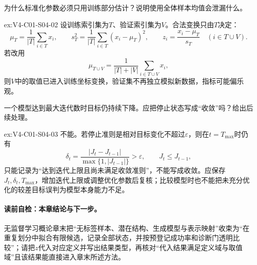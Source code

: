 \begin{SLChapterExercisePairSection}
\begin{exercise}\label{ex:V4-C01-S04-02}
为什么标准化参数必须只用训练部分估计？说明使用全体样本均值会泄漏什么。
\end{exercise}
\ifSLFullEdition
{}\label{sol:V4-C01-S04-02}
\begin{chapterexercisesolution}{ex:V4-C01-S04-02}
设训练索引集为$T$、验证索引集为$V$。合法变换只由$T$决定：
\[
\mu_T=\frac1{|T|}\sum_{i\in T}x_i,
\qquad
s_T^2=\frac1{|T|}\sum_{i\in T}(x_i-\mu_T)^2,
\qquad
z_i=\frac{x_i-\mu_T}{s_T}\quad(i\in T\cup V).
\]
若改用
\[
\mu_{T\cup V}=\frac1{|T|+|V|}\sum_{i\in T\cup V}x_i,
\]
则$V$中的取值已进入训练坐标变换，验证集不再独立模拟新数据，指标可能偏乐观。
\end{chapterexercisesolution}
\fi

\begin{exercise}\label{ex:V4-C01-S04-03}
一个模型达到最大迭代数时目标仍持续下降。应把停止状态写成“收敛”吗？给出后续处理。
\end{exercise}
\ifSLFullEdition
{}\label{sol:V4-C01-S04-03}
\begin{chapterexercisesolution}{ex:V4-C01-S04-03}
不能。若停止准则是相对目标变化不超过$\varepsilon$，则在$t=T_{\max}$时仍有
\[
\delta_t=\frac{|J_t-J_{t-1}|}{\max\{1,|J_{t-1}|\}}>\varepsilon,
\qquad
J_t\le J_{t-1},
\]
只能记录为“达到迭代上限且尚未满足收敛准则”，不能写成收敛。应保存$J_t,\delta_t,T_{\max}$，增加迭代上限或调整优化参数后复核；比较模型时也不能把未充分优化的较差目标误判为模型本身能力不足。
\end{chapterexercisesolution}
\fi

\end{SLChapterExercisePairSection}

\paragraph{读前自检：本章结论与下一步。}无监督学习概论章末把“无标签样本、潜在结构、生成模型与表示映射”收束为“在重复划分中拟合有限候选，记录全部状态，并按预登记成功率和诊断门透明比较”；请把$z$代入对应定义并写出结果类型，再核对“代入结果满足定义域与取值域”且该结果能直接进入章末所述方法。\par

